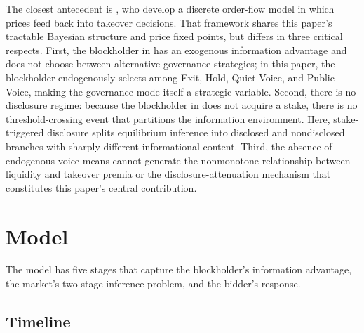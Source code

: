 \documentclass[11pt]{article}
\newcommand{\1}{\mathbf{1}}
\begin{document}
The closest antecedent is \citet{EdmansGoldsteinJiang2015}, who develop a discrete order-flow model in which prices feed back into takeover decisions. That framework shares this paper's tractable Bayesian structure and price fixed points, but differs in three critical respects. First, the blockholder in \citet{EdmansGoldsteinJiang2015} has an exogenous information advantage and does not choose between alternative governance strategies; in this paper, the blockholder endogenously selects among Exit, Hold, Quiet Voice, and Public Voice, making the governance mode itself a strategic variable. Second, there is no disclosure regime: because the blockholder in \citet{EdmansGoldsteinJiang2015} does not acquire a stake, there is no threshold-crossing event that partitions the information environment. Here, stake-triggered disclosure splits equilibrium inference into disclosed and nondisclosed branches with sharply different informational content. Third, the absence of endogenous voice means \citet{EdmansGoldsteinJiang2015} cannot generate the nonmonotone relationship between liquidity and takeover premia or the disclosure-attenuation mechanism that constitutes this paper's central contribution.
\section{Model}
\label{sec:model}

The model has five stages that capture the blockholder's information advantage, the market's two-stage inference problem, and the bidder's response.

%
\subsection{Timeline}
%
\end{document}
